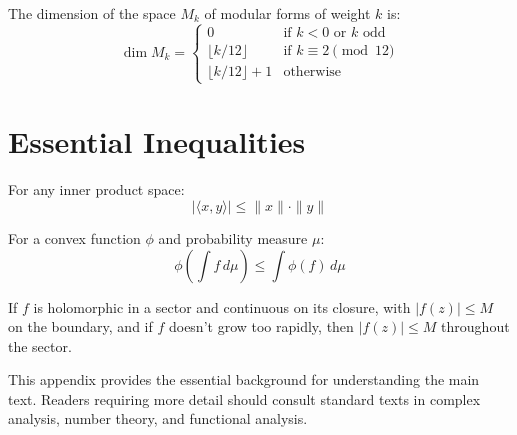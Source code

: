 \begin{theorem}
The dimension of the space $M_k$ of modular forms of weight $k$ is:
\[
\dim M_k = \begin{cases}
0 & \text{if } k < 0 \text{ or } k \text{ odd} \\
\lfloor k/12 \rfloor & \text{if } k \equiv 2 \pmod{12} \\
\lfloor k/12 \rfloor + 1 & \text{otherwise}
\end{cases}
\]
\end{theorem}

\section{Essential Inequalities}

\begin{theorem}
For any inner product space:
\[
|\langle x, y \rangle| \leq \|x\| \cdot \|y\|
\]
\end{theorem}

\begin{theorem}
For a convex function $\phi$ and probability measure $\mu$:
\[
\phi\left(\int f \, d\mu\right) \leq \int \phi(f) \, d\mu
\]
\end{theorem}

\begin{theorem}
If $f$ is holomorphic in a sector and continuous on its closure, with $|f(z)| \leq M$ on the boundary, and if $f$ doesn't grow too rapidly, then $|f(z)| \leq M$ throughout the sector.
\end{theorem}

This appendix provides the essential background for understanding the main text. Readers requiring more detail should consult standard texts in complex analysis, number theory, and functional analysis.
